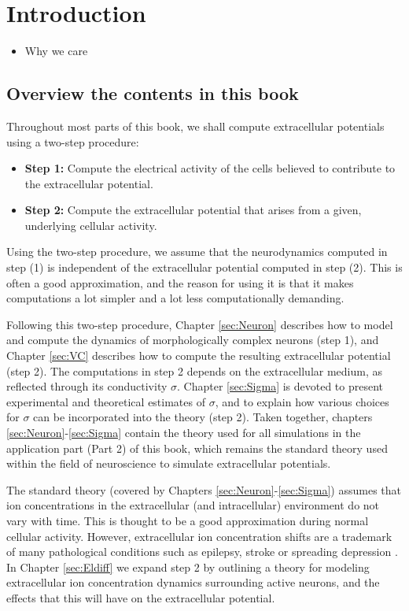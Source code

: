 \section{Introduction} 
\label{sec:Intro}

\begin{itemize}
\item Why we care \citep{Buzsaki2012,Pettersen2012,Einevoll2013,Einevoll2013a,Einevoll2019}
\end{itemize}


\subsection{Overview the contents in this book}
Throughout most parts of this book, we shall compute extracellular potentials using a two-step procedure:  

\begin{itemize}
\item {\bf Step 1:} Compute the electrical activity of the cells believed to contribute to the extracellular potential. 
\item {\bf Step 2:} Compute the extracellular potential that arises from a given, underlying cellular activity.
\end{itemize}

Using the two-step procedure, we assume that the neurodynamics computed in step (1) is independent of the extracellular potential computed in step (2). This is often a good approximation, and the reason for using it is that it makes computations a lot simpler and a lot less computationally demanding. 

Following this two-step procedure, Chapter \ref{sec:Neuron} describes how to model and compute the dynamics of morphologically complex neurons (step 1), and Chapter \ref{sec:VC} describes how to compute the resulting extracellular potential (step 2). The computations in step 2 depends on the extracellular medium, as reflected through its conductivity $\sigma$. Chapter \ref{sec:Sigma} is devoted to present experimental and theoretical estimates of $\sigma$, and to explain how various choices for  $\sigma$ can be incorporated into the theory (step 2). Taken together, chapters \ref{sec:Neuron}-\ref{sec:Sigma} contain the theory used for all simulations in the application part (Part 2) of this book, which remains the standard theory used within the field of neuroscience to simulate extracellular potentials. 

The standard theory (covered by Chapters \ref{sec:Neuron}-\ref{sec:Sigma}) assumes that ion concentrations in the extracellular (and intracellular) environment do not vary with time. This is thought to be a good approximation during normal cellular activity. However, extracellular ion concentration shifts are a trademark of many pathological conditions such as epilepsy, stroke or spreading depression \cite{Somjen2001, Frohlich2008, Zandt2015review, Ayata2015}. In Chapter \ref{sec:Eldiff} we expand step 2 by outlining a theory for modeling extracellular ion concentration dynamics surrounding active neurons, and the effects that this will have on the extracellular potential. 

